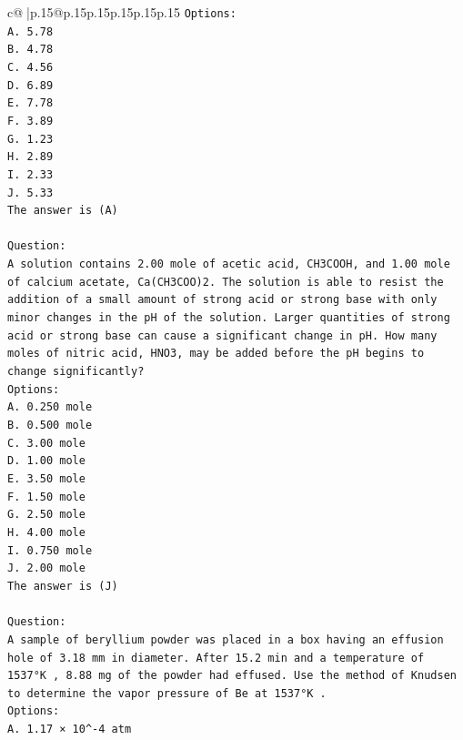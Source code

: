 \documentclass{article}
\begin{document}
{\begin{supertabular}{c@{$\;$}|p{.15\linewidth}@{}p{.15\linewidth}p{.15\linewidth}p{.15\linewidth}p{.15\linewidth}p{.15\linewidth}}
{{{\texttt{Options:} \\
\texttt{A. 5.78} \\
\texttt{B. 4.78} \\
\texttt{C. 4.56} \\
\texttt{D. 6.89} \\
\texttt{E. 7.78} \\
\texttt{F. 3.89} \\
\texttt{G. 1.23} \\
\texttt{H. 2.89} \\
\texttt{I. 2.33} \\
\texttt{J. 5.33} \\
\texttt{The answer is (A)} \\
\\ 
\texttt{Question:} \\
\texttt{A solution contains 2.00 mole of acetic acid, CH3COOH, and 1.00 mole of calcium acetate, Ca(CH3COO)2. The solution is able to resist the addition of a small amount of strong acid or strong base with only minor changes in the pH of the solution. Larger quantities of strong acid or strong base can cause a significant change in pH. How many moles of nitric acid, HNO3, may be added before the pH begins to change significantly?} \\
\texttt{Options:} \\
\texttt{A. 0.250 mole} \\
\texttt{B. 0.500 mole} \\
\texttt{C. 3.00 mole} \\
\texttt{D. 1.00 mole} \\
\texttt{E. 3.50 mole} \\
\texttt{F. 1.50 mole} \\
\texttt{G. 2.50 mole} \\
\texttt{H. 4.00 mole} \\
\texttt{I. 0.750 mole} \\
\texttt{J. 2.00 mole} \\
\texttt{The answer is (J)} \\
\\ 
\texttt{Question:} \\
\texttt{A sample of beryllium powder was placed in a box having an effusion hole of 3.18 mm in diameter. After 15.2 min and a temperature of 1537°K , 8.88 mg of the powder had effused. Use the method of Knudsen to determine the vapor pressure of Be at 1537°K .} \\
\texttt{Options:} \\
\texttt{A. 1.17 × 10\^{}{-}4 atm} \\
}}}
\end{supertabular}}
\end{document}
